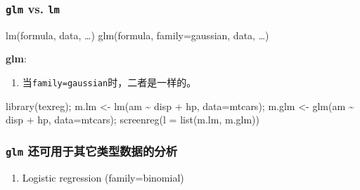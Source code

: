 \documentclass[
]{article}
\newenvironment{Shaded}{}{}
\newcommand{\AttributeTok}[1]{\textcolor[rgb]{0.49,0.56,0.16}{#1}}
\newcommand{\FunctionTok}[1]{\textcolor[rgb]{0.02,0.16,0.49}{#1}}
\newcommand{\NormalTok}[1]{#1}
\newcommand{\OtherTok}[1]{\textcolor[rgb]{0.00,0.44,0.13}{#1}}
\newcommand{\SpecialCharTok}[1]{\textcolor[rgb]{0.25,0.44,0.63}{#1}}
\begin{document}
\hypertarget{glm-vs-lm}{%
\subsubsection{\texorpdfstring{\texttt{glm} vs.
\texttt{lm}}{glm vs. lm}}\label{glm-vs-lm}}

\begin{Shaded}
\begin{Highlighting}[]
\NormalTok{lm(formula, data, …)}
\NormalTok{glm(formula, family=gaussian, data, …)}
\end{Highlighting}
\end{Shaded}

\textbf{glm}:

\begin{enumerate}
\def\labelenumi{\arabic{enumi}.}
\item
  当\texttt{family=gaussian}时，二者是一样的。
\end{enumerate}

\begin{Shaded}
\begin{Highlighting}[]
\FunctionTok{library}\NormalTok{(texreg);}
\NormalTok{m.lm }\OtherTok{\textless{}{-}} \FunctionTok{lm}\NormalTok{(am }\SpecialCharTok{\textasciitilde{}}\NormalTok{ disp }\SpecialCharTok{+}\NormalTok{ hp, }\AttributeTok{data=}\NormalTok{mtcars);}
\NormalTok{m.glm }\OtherTok{\textless{}{-}} \FunctionTok{glm}\NormalTok{(am }\SpecialCharTok{\textasciitilde{}}\NormalTok{ disp }\SpecialCharTok{+}\NormalTok{ hp, }\AttributeTok{data=}\NormalTok{mtcars);}
\FunctionTok{screenreg}\NormalTok{(}\AttributeTok{l =} \FunctionTok{list}\NormalTok{(m.lm, m.glm))}
\end{Highlighting}
\end{Shaded}

\hypertarget{glm-ux8fd8ux53efux7528ux4e8eux5176ux5b83ux7c7bux578bux6570ux636eux7684ux5206ux6790}{%
\subsubsection{\texorpdfstring{\texttt{glm}
还可用于其它类型数据的分析}{glm 还可用于其它类型数据的分析}}\label{glm-ux8fd8ux53efux7528ux4e8eux5176ux5b83ux7c7bux578bux6570ux636eux7684ux5206ux6790}}

\begin{enumerate}
\def\labelenumi{\arabic{enumi}.}
\item
  Logistic regression (family=binomial)
\end{enumerate}
\end{document}
